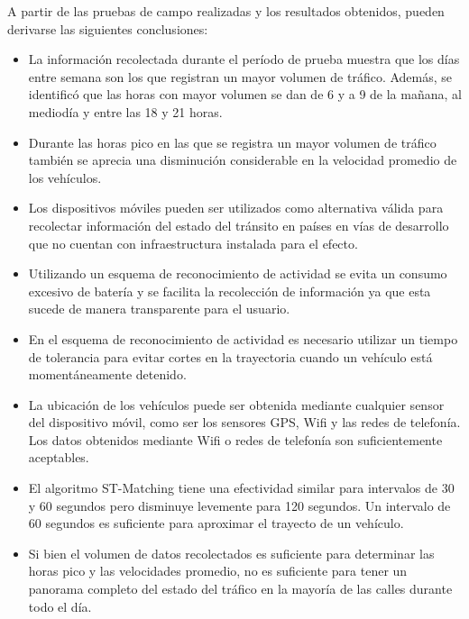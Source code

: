 A partir de las pruebas de campo realizadas y los resultados obtenidos, pueden derivarse las siguientes conclusiones:
\begin{itemize}
\item La información recolectada durante el período de prueba muestra que los días entre semana son los que registran un mayor volumen de tráfico. Además, se identificó que las horas con mayor volumen se dan de 6 y a 9 de la mañana, al mediodía y entre las 18 y 21 horas.

\item Durante las horas pico en las que se registra un mayor volumen de tráfico también se aprecia una disminución considerable en la velocidad promedio de los vehículos.

\item Los dispositivos móviles pueden ser utilizados como alternativa válida para recolectar información del estado del tránsito en países en vías de desarrollo que no cuentan con infraestructura instalada para el efecto.

\item Utilizando un esquema de reconocimiento de actividad se evita un consumo excesivo de batería y se facilita la recolección de información ya que esta sucede de manera transparente para el usuario.

\item En el esquema de reconocimiento de actividad es necesario utilizar un tiempo de tolerancia para evitar cortes en la trayectoria cuando un vehículo está momentáneamente detenido.

\item La ubicación de los vehículos puede ser obtenida mediante cualquier sensor del dispositivo móvil, como ser los sensores GPS, Wifi y las redes de telefonía. Los datos obtenidos mediante Wifi o redes de telefonía son suficientemente aceptables.

\item El algoritmo ST-Matching tiene una efectividad similar para intervalos de 30 y 60 segundos pero disminuye levemente para 120 segundos. Un intervalo de 60 segundos es suficiente para aproximar el trayecto de un vehículo.

\item Si bien el volumen de datos recolectados es suficiente para determinar las horas pico y las velocidades promedio, no es suficiente para tener un panorama completo del estado del tráfico en la mayoría de las calles durante todo el día.
\end{itemize}

